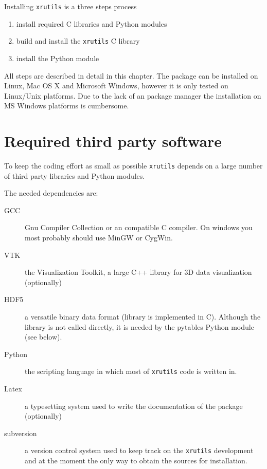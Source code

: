
Installing {\tt xrutils} is a three steps process
\begin{enumerate}
\item install required C libraries and Python modules
\item build and install the {\tt xrutils} C library
\item install the Python module
\end{enumerate}
All steps are described in detail in this chapter. The package can be installed on Linux, Mac OS X and Microsoft Windows, however it is only tested on Linux/Unix platforms. Due to the lack of an package manager the installation on MS Windows platforms is cumbersome.

\section{Required third party software}
To keep the coding effort as small as possible {\tt xrutils} depends on a 
large number of third party libraries and Python modules. 

The needed dependencies are: 
\begin{description}
\item[GCC] Gnu Compiler Collection or an compatible C compiler. On windows you most probably should use MinGW or CygWin.
\item[VTK] the Visualization Toolkit, a large C++ library for 3D data
visualization (optionally)
\item[HDF5] a versatile binary data format (library is implemented in C).
Although the library is not called directly, it is needed by the pytables Python
module (see below).
\item[Python] the scripting language in which most of {\tt xrutils} code is written in.
\item[Latex] a typesetting system used to write the documentation of the package (optionally)
\item[subversion] a version control system used to keep track on the {\tt xrutils} development and at the moment the only way to obtain the sources for installation.
\end{description}


